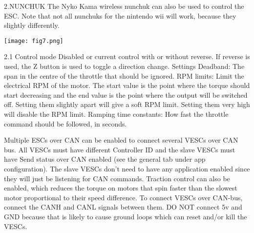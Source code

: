 \documentclass[11pt]{article}
\begin{document}
2.NUNCHUK\newline
The Nyko Kama wireless nunchuk can also be used to control the ESC. Note that not all nunchuks for the nintendo wii will work, because they slightly differently.\newline

\begin {center}
\texttt{[image: fig7.png]}\newline

\end{center}

2.1 Control mode\newline
Disabled or current control with or without reverse. If reverse is used, the Z button is used to toggle a direction change.\newline
\newline
\newline
{} Settings\newline
Deadband: The span in the centre of the throttle that should be ignored.\newline
RPM limits: Limit the electrical RPM of the motor. The start value is the point where the torque should start decreasing and the end value is the point where the output will be switched off. Setting them slightly apart will give a soft RPM limit. Setting them very high will disable the RPM limit.\newline
Ramping time constants: How fast the throttle command should be followed, in seconds.\newline

Multiple ESCs over CAN can be enabled to connect several VESCs over CAN bus. All VESCs must have different Controller ID and the slave VESCs must have Send status over CAN enabled (see the general tab under app configuration). The slave VESCs don’t need to have any application enabled since they will just be listening for CAN commands. Traction control can also be enabled, which reduces the torque on motors that spin faster than the slowest motor proportional to their speed difference. To connect VESCs over CAN-bus, connect the CANH and CANL signals between them. DO NOT connect 5v and GND because that is likely to cause ground loops which can reset and/or kill the VESCs.\newline
\end{document}
